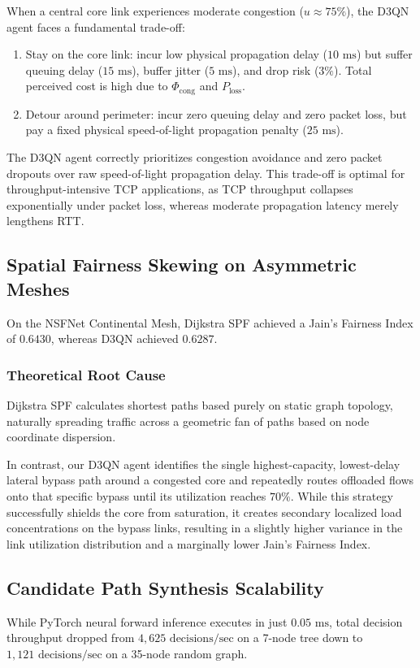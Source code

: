 \documentclass[12pt,a4paper,oneside]{report}
\begin{document}
When a central core link experiences moderate congestion ($u \approx 75\%$), the D3QN agent faces a fundamental trade-off:
\begin{enumerate}
    \item Stay on the core link: incur low physical propagation delay ($10\text{ ms}$) but suffer queuing delay ($15\text{ ms}$), buffer jitter ($5\text{ ms}$), and drop risk ($3\%$). Total perceived cost is high due to $\Phi_{\text{cong}}$ and $P_{\text{loss}}$.
    \item Detour around perimeter: incur zero queuing delay and zero packet loss, but pay a fixed physical speed-of-light propagation penalty ($25\text{ ms}$).
\end{enumerate}
The D3QN agent correctly prioritizes congestion avoidance and zero packet dropouts over raw speed-of-light propagation delay. This trade-off is optimal for throughput-intensive TCP applications, as TCP throughput collapses exponentially under packet loss, whereas moderate propagation latency merely lengthens RTT.

\subsection{Spatial Fairness Skewing on Asymmetric Meshes}
On the NSFNet Continental Mesh, Dijkstra SPF achieved a Jain's Fairness Index of $0.6430$, whereas D3QN achieved $0.6287$.

\subsubsection{Theoretical Root Cause}
Dijkstra SPF calculates shortest paths based purely on static graph topology, naturally spreading traffic across a geometric fan of paths based on node coordinate dispersion. 

In contrast, our D3QN agent identifies the single highest-capacity, lowest-delay lateral bypass path around a congested core and repeatedly routes offloaded flows onto that specific bypass until its utilization reaches $70\%$. While this strategy successfully shields the core from saturation, it creates secondary localized load concentrations on the bypass links, resulting in a slightly higher variance in the link utilization distribution and a marginally lower Jain's Fairness Index.

\subsection{Candidate Path Synthesis Scalability}
While PyTorch neural forward inference executes in just $0.05\text{ ms}$, total decision throughput dropped from $4,625\text{ decisions/sec}$ on a 7-node tree down to $1,121\text{ decisions/sec}$ on a 35-node random graph.
\end{document}
